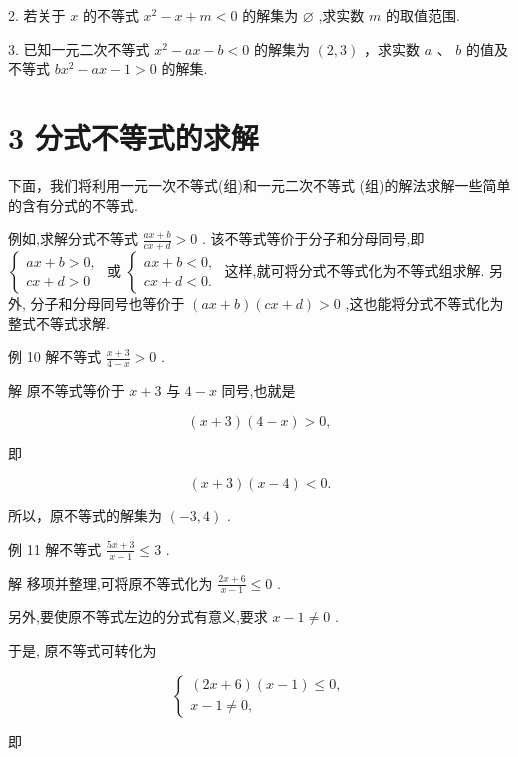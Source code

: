 \documentclass[10pt]{article}
\begin{document}
2. 若关于 \(x\) 的不等式 \({x}^{2} - x + m < 0\) 的解集为 \(\varnothing\) ,求实数 \(m\) 的取值范围.

3. 已知一元二次不等式 \({x}^{2} - {ax} - b < 0\) 的解集为 \(\left( {2,3}\right)\) ，求实数 \(a\) 、 \(b\) 的值及不等式 \(b{x}^{2} - {ax} - 1 > 0\) 的解集.

\section*{3 分式不等式的求解}

下面，我们将利用一元一次不等式(组)和一元二次不等式 (组)的解法求解一些简单的含有分式的不等式.

例如,求解分式不等式 \(\frac{{ax} + b}{{cx} + d} > 0\) . 该不等式等价于分子和分母同号,即 \(\left\{  \begin{array}{l} {ax} + b > 0, \\  {cx} + d > 0 \end{array}\right.\) 或 \(\left\{  \begin{array}{l} {ax} + b < 0, \\  {cx} + d < 0. \end{array}\right.\) 这样,就可将分式不等式化为不等式组求解. 另外, 分子和分母同号也等价于 \(\left( {{ax} + b}\right) \left( {{cx} + d}\right)  > 0\) ,这也能将分式不等式化为整式不等式求解.

例 10 解不等式 \(\frac{x + 3}{4 - x} > 0\) .

解 原不等式等价于 \(x + 3\) 与 \(4 - x\) 同号,也就是

\[
\left( {x + 3}\right) \left( {4 - x}\right)  > 0,
\]

即

\[
\left( {x + 3}\right) \left( {x - 4}\right)  < 0.
\]

所以，原不等式的解集为 \(\left( {-3,4}\right)\) .

例 11 解不等式 \(\frac{{5x} + 3}{x - 1} \leq  3\) .

解 移项并整理,可将原不等式化为 \(\frac{{2x} + 6}{x - 1} \leq  0\) .

另外,要使原不等式左边的分式有意义,要求 \(x - 1 \neq  0\) .

于是, 原不等式可转化为

\[
\left\{  \begin{array}{l} \left( {{2x} + 6}\right) \left( {x - 1}\right)  \leq  0, \\  x - 1 \neq  0, \end{array}\right.
\]

即
\end{document}
